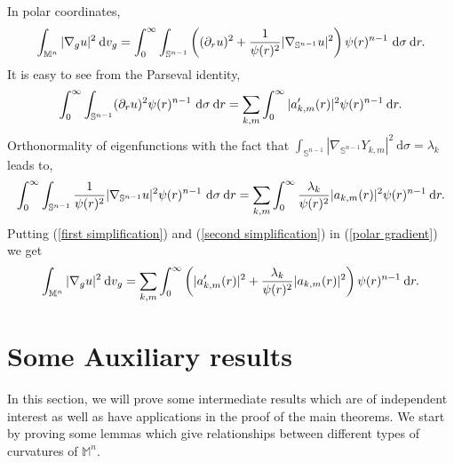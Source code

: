\documentclass[a4paper,11pt,reqno]{amsart}
\renewcommand\eqref[1]{(\ref{#1})}
\theoremstyle{plain}
\numberwithin{equation}{section} \allowdisplaybreaks
\newcommand{\dvg}{\: {\rm d}v_{g}}
\newcommand{\gradg}{\nabla_g}
\newcommand{\m}{\mathbb{M}^n}
\newcommand{\dr}{\:{\rm d}r}
\newcommand{\sn}{\mathbb{S}^{n-1}}
\begin{document}
In polar coordinates,
\begin{equation}\label{polar gradient}
    \int_{\m}|\gradg u|^2\dvg=\int_0^{\infty}\int_{\sn}\left((\partial_ru)^2+\frac{1}{\psi(r)^2}|\nabla_{\sn}u|^2\right)\psi(r)^{n-1}\ \mathrm{d}\sigma\dr.
\end{equation}
It is easy to see from the Parseval identity,
\begin{equation}\label{first simplification}
    \int_0^{\infty}\int_{\sn}(\partial_ru)^2\psi(r)^{n-1}\ \mathrm{d}\sigma\dr=\sum_{k,m}\int_0^{\infty}|a'_{k,m}(r)|^2\psi(r)^{n-1}\dr.
\end{equation}
Orthonormality of eigenfunctions with the fact that $\int_{\sn}|\nabla_{\sn}Y_{k,m}|^2\ \mathrm{d}\sigma=\lambda_k$ leads to,
\begin{equation}\label{second simplification}
    \int_0^{\infty}\int_{\sn} \frac{1}{\psi(r)^2}|\nabla_{\sn}u|^2\psi(r)^{n-1}\ \mathrm{d}\sigma\dr=\sum_{k,m}\int_0^{\infty}\frac{\lambda_k}{\psi(r)^2}|a_{k,m}(r)|^2\psi(r)^{n-1}\dr.
\end{equation}
Putting \eqref{first simplification} and \eqref{second simplification} in \eqref{polar gradient} we get
\begin{equation}\label{gradient simplification with sh}
    \int_{\m}|\gradg u|^2\dvg=\sum_{k,m}\int_0^{\infty}\left(|a'_{k,m}(r)|^2+\frac{\lambda_k}{\psi(r)^2}|a_{k,m}(r)|^2\right)\psi(r)^{n-1}\dr.
\end{equation}
\medskip

\section{Some Auxiliary results}\label{auxiliary}
In this section, we will prove some intermediate results which are of independent interest as well as have applications in the proof of the main theorems. We start by proving some lemmas which give relationships between different types of curvatures of $\m$.
\end{document}
